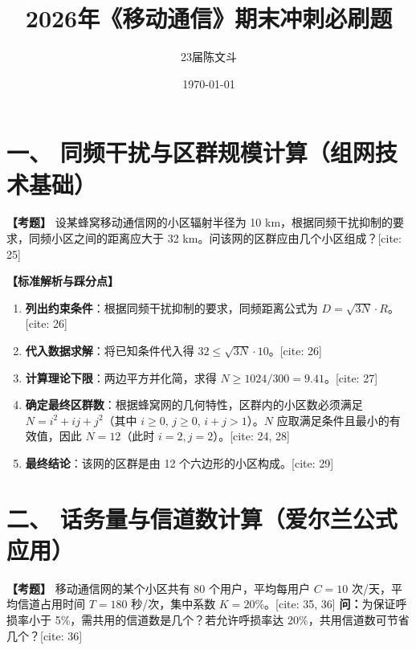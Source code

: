 \documentclass[12pt, a4paper]{ctexart}
\title{\textbf{\Huge 2026年《移动通信》期末冲刺必刷题}}
\author{23届陈文斗}
\date{\today}
\begin{document}
	\maketitle

	\section*{一、 同频干扰与区群规模计算（组网技术基础）}

	\textbf{【考题】}
	设某蜂窝移动通信网的小区辐射半径为 10 km，根据同频干扰抑制的要求，同频小区之间的距离应大于 32 km。问该网的区群应由几个小区组成？[cite: 25]

	\vspace{0.5em}
	\noindent\textbf{【标准解析与踩分点】}
	\begin{enumerate}[label=\arabic*.]
		\item \textbf{列出约束条件}：根据同频干扰抑制的要求，同频距离公式为 $D = \sqrt{3N} \cdot R$。[cite: 26]
		\item \textbf{代入数据求解}：将已知条件代入得 $32 \le \sqrt{3N} \cdot 10$。[cite: 26]
		\item \textbf{计算理论下限}：两边平方并化简，求得 $N \ge 1024 / 300 = 9.41$。[cite: 27]
		\item \textbf{确定最终区群数}：根据蜂窝网的几何特性，区群内的小区数必须满足 $N = i^{2} + ij + j^{2}$（其中 $i \ge 0$, $j \ge 0$, $i+j > 1$）。$N$ 应取满足条件且最小的有效值，因此 $N = 12$（此时 $i=2, j=2$）。[cite: 24, 28]
		\item \textbf{最终结论}：该网的区群是由 12 个六边形的小区构成。[cite: 29]
	\end{enumerate}

	\vspace{1.5em}

	\section*{二、 话务量与信道数计算（爱尔兰公式应用）}

	\textbf{【考题】}
	移动通信网的某个小区共有 80 个用户，平均每用户 $C=10$ 次/天，平均信道占用时间 $T=180$ 秒/次，集中系数 $K=20\%$。[cite: 35, 36]
	\textbf{问：}为保证呼损率小于 5\%，需共用的信道数是几个？若允许呼损率达 20\%，共用信道数可节省几个？[cite: 36]
\end{document}
